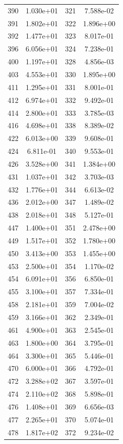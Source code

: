 \documentclass[12pt]{article}
\begin{document}
\begin{longtable}{@{}cccc@{}}
390 & 1.030e+01 & 321 & 7.588e-02 \\
391 & 1.802e+01 & 322 & 1.896e+00 \\
392 & 1.477e+01 & 323 & 8.017e-01 \\
396 & 6.056e+01 & 324 & 7.238e-01 \\
400 & 1.197e+01 & 328 & 4.856e-03 \\
403 & 4.553e+01 & 330 & 1.895e+00 \\
411 & 1.295e+01 & 331 & 8.001e-01 \\
412 & 6.974e+01 & 332 & 9.492e-01 \\
414 & 2.800e+01 & 333 & 3.785e-03 \\
416 & 4.698e+01 & 338 & 8.389e-02 \\
422 & 6.013e+00 & 339 & 9.608e-01 \\
424 & 6.811e-01 & 340 & 9.553e-01 \\
426 & 3.528e+00 & 341 & 1.384e+00 \\
431 & 1.037e+01 & 342 & 3.703e-03 \\
432 & 1.776e+01 & 344 & 6.613e-02 \\
436 & 2.012e+00 & 347 & 1.489e-02 \\
438 & 2.018e+01 & 348 & 5.127e-01 \\
447 & 1.400e+01 & 351 & 2.478e+00 \\
449 & 1.517e+01 & 352 & 1.780e+00 \\
450 & 3.413e+00 & 353 & 1.455e+00 \\
453 & 2.500e+01 & 354 & 1.170e-02 \\
454 & 6.091e+01 & 356 & 6.850e-01 \\
455 & 3.100e+01 & 357 & 7.334e-01 \\
458 & 2.181e+01 & 359 & 7.004e-02 \\
459 & 3.166e+01 & 362 & 2.349e-01 \\
461 & 4.900e+01 & 363 & 2.545e-01 \\
463 & 1.800e+00 & 364 & 3.795e-01 \\
464 & 3.300e+01 & 365 & 5.446e-01 \\
470 & 6.000e+01 & 366 & 4.792e-01 \\
472 & 3.288e+02 & 367 & 3.597e-01 \\
474 & 2.110e+02 & 368 & 5.898e-01 \\
476 & 1.408e+01 & 369 & 6.656e-03 \\
477 & 2.265e+01 & 370 & 5.074e-01 \\
478 & 1.817e+02 & 372 & 9.234e-02 \\

\end{longtable}
\end{document}
